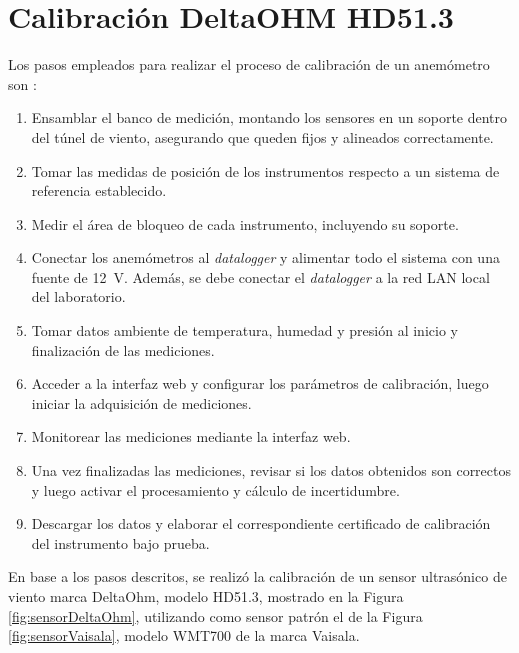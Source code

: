 \section{Calibración DeltaOHM HD51.3}\label{sec:calibDeltaOhm}

Los pasos empleados para realizar el proceso de calibración de un anemómetro son \cite{ISO16622} \cite{IEC61400-12-1}  \cite{procedimientoSMNLaboratorio2024}:
\begin{enumerate}
    \item Ensamblar el banco de medición, montando los sensores en un soporte dentro del túnel de viento, asegurando que queden fijos y alineados correctamente.
    \item Tomar las medidas de posición de los instrumentos respecto a un sistema de referencia establecido.
    \item Medir el área de bloqueo de cada instrumento, incluyendo su soporte.
    \item Conectar los anemómetros al \textit{datalogger} y alimentar todo el sistema con una fuente de \SI{12}{V}. Además, se debe conectar el \textit{datalogger} a la red LAN local del laboratorio.
    \item Tomar datos ambiente de temperatura, humedad y presión al inicio y finalización de las mediciones.
    \item Acceder a la interfaz web y configurar los parámetros de calibración, luego iniciar la adquisición de mediciones.
    \item Monitorear las mediciones mediante la interfaz web.
    \item Una vez finalizadas las mediciones, revisar si los datos obtenidos son correctos y luego activar el procesamiento y cálculo de incertidumbre.
    \item Descargar los datos y elaborar el correspondiente certificado de calibración del instrumento bajo prueba.
\end{enumerate}



En base a los pasos descritos, se realizó la calibración de un sensor ultrasónico de viento marca DeltaOhm, modelo HD51.3, mostrado en la Figura \ref{fig:sensorDeltaOhm}, utilizando como sensor patrón el de la Figura \ref{fig:sensorVaisala}, modelo WMT700 de la marca Vaisala.

